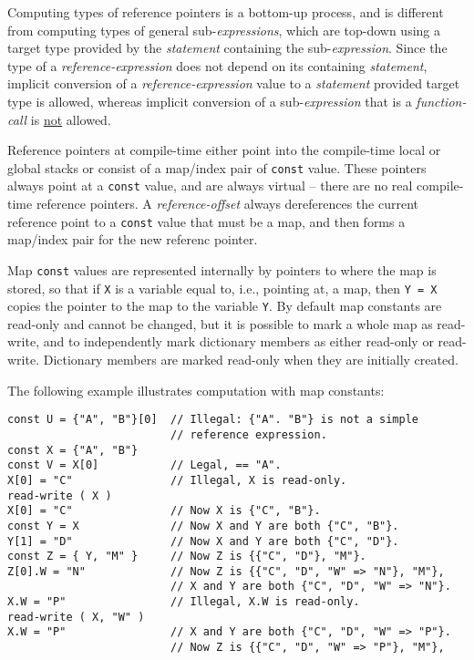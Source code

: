 \documentclass[12pt]{article}
\newenvironment{indpar}[1][0.3in]%
	{\begin{list}{}%
		     {\setlength{\itemsep}{0in}%
		      \setlength{\topsep}{0in}%
		      \setlength{\parsep}{1ex}%
		      \setlength{\labelwidth}{#1}%
		      \setlength{\leftmargin}{#1}%
		      \addtolength{\leftmargin}{\labelsep}}%
	 \item}%
	{\end{list}}
\begin{document}
Computing types of reference pointers is a bottom-up process,
and is different from computing types of general
sub-{\em expressions}, which are top-down using a target type
provided by the {\em statement} containing the sub-{\em expression}.
Since the type of a {\em reference-expression} does not depend on
its containing {\em statement}, implicit conversion of a
{\em reference-expression} value to a {\em statement} provided
target type is allowed, whereas implicit conversion
of a sub-{\em expression} that is a {\em function-call}
is \underline{not} allowed.

Reference pointers at compile-time either point into the compile-time
local or global stacks or consist of a map/index pair of {\tt const}
value.  These pointers always point at a {\tt const} value, and
are always virtual -- there are no real compile-time reference pointers.
A {\em reference-offset} always dereferences the current reference point
to a {\tt const} value that must be a map, and then forms a map/index
pair for the new referenc pointer.

Map {\tt const} values are represented internally by pointers to where
the map is stored, so that if {\tt X} is a variable equal to,
i.e., pointing at, a map, then {\tt Y = X} copies the pointer
to the map to the variable {\tt Y}.  By default map constants
are read-only and cannot be changed, but it is possible to mark
a whole map as read-write, and to independently mark dictionary members
as either read-only or read-write.
Dictionary members are marked read-only when they are initially created.

The following example illustrates
computation with map constants:
\begin{indpar}\begin{verbatim}
const U = {"A", "B"}[0]  // Illegal: {"A". "B"} is not a simple
                         // reference expression.
const X = {"A", "B"}
const V = X[0]           // Legal, == "A".
X[0] = "C"               // Illegal, X is read-only.
read-write ( X )
X[0] = "C"               // Now X is {"C", "B"}.
const Y = X              // Now X and Y are both {"C", "B"}. 
Y[1] = "D"               // Now X and Y are both {"C", "D"}. 
const Z = { Y, "M" }     // Now Z is {{"C", "D"}, "M"}.
Z[0].W = "N"             // Now Z is {{"C", "D", "W" => "N"}, "M"},
                         // X and Y are both {"C", "D", "W" => "N"}.
X.W = "P"                // Illegal, X.W is read-only.
read-write ( X, "W" )
X.W = "P"                // X and Y are both {"C", "D", "W" => "P"}.
                         // Now Z is {{"C", "D", "W" => "P"}, "M"},
\end{verbatim}\end{indpar}
\end{document}
